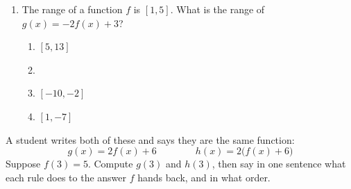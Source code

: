 \documentclass[10pt]{article}
\begin{document}
\begin{enumerate}[itemsep=10pt]
\begin{enumerate}[label=(\alph*), itemsep=6pt]
        \begin{work}
           &= 2 - 1 = 1 \\
           &= 2(7) - 5 = 9
        \end{work}

        It lands at (  ,  ).

  \item Domain of $g$:

        \begin{work}
          -4 &\le x + 1  \\
          -5 &\le x 
        \end{work}

        Domain of $g$: \ans{$[-5,\,1]$}

  \item Range of $g$:

        \begin{work}
          2(-1) - 5 &= -7 \\
           2(7) - 5 &= 9
        \end{work}

        Range of $g$: \ans{$[-7,\,9]$}

  \item Which piece of the rule moved the domain, and which moved the range?

        \vspace{0.05in}
\end{enumerate}

\item The range of a function $f$ is $[1, 5]$. What is the range of
      $g(x) = -2f(x) + 3$?

\begin{enumerate}[label=\Alph*., itemsep=3pt]
  \item $[5, 13]$
  \item \ans{$[-7, 1]$}
  \item $[-10, -2]$
  \item $[1, -7]$
\end{enumerate}

\end{enumerate}

\vspace{0.1in}

\boxguard
\begin{extensionbox}
A student writes both of these and says they are the same function:
\[
  g(x) = 2f(x) + 6 \qquad\qquad h(x) = 2\bigl(f(x) + 6\bigr)
\]
Suppose $f(3) = 5$. Compute $g(3)$ and $h(3)$, then say in one sentence what
each rule does to the answer $f$ hands back, and in what order.

\vspace{0.05in}
\end{extensionbox}
\end{document}
